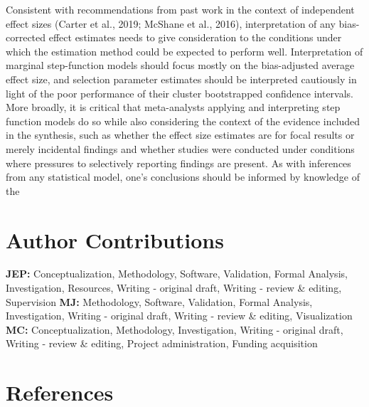 \documentclass[
  man, donotrepeattitle,floatsintext]{apa7}
\begin{document}
Consistent with recommendations from past work in the context of independent effect sizes (Carter et al., 2019; McShane et al., 2016), interpretation of any bias-corrected effect estimates needs to give consideration to the conditions under which the estimation method could be expected to perform well.
Interpretation of marginal step-function models should focus mostly on the bias-adjusted average effect size, and selection parameter estimates should be interpreted cautiously in light of the poor performance of their cluster bootstrapped confidence intervals.
More broadly, it is critical that meta-analysts applying and interpreting step function models do so while also considering the context of the evidence included in the synthesis, such as whether the effect size estimates are for focal results or merely incidental findings and whether studies were conducted under conditions where pressures to selectively reporting findings are present.
As with inferences from any statistical model, one's conclusions should be informed by knowledge of the

\section*{Author Contributions}\label{author-contributions}

\textbf{JEP:} Conceptualization, Methodology, Software, Validation, Formal Analysis, Investigation, Resources, Writing - original draft, Writing - review \& editing, Supervision \textbf{MJ:} Methodology, Software, Validation, Formal Analysis, Investigation, Writing - original draft, Writing - review \& editing, Visualization \textbf{MC:} Conceptualization, Methodology, Investigation, Writing - original draft, Writing - review \& editing, Project administration, Funding acquisition

\newpage

\section*{References}\label{references}

\begingroup
\setlength{\parindent}{-0.5in}
\end{document}
